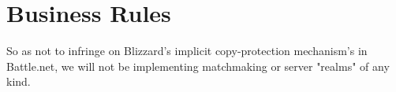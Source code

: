 \section{Business Rules} \label{sec:business_rules}

 
So as not to infringe on Blizzard's implicit copy-protection mechanism's in
Battle.net, we will not be implementing matchmaking or server "realms" of any kind.
